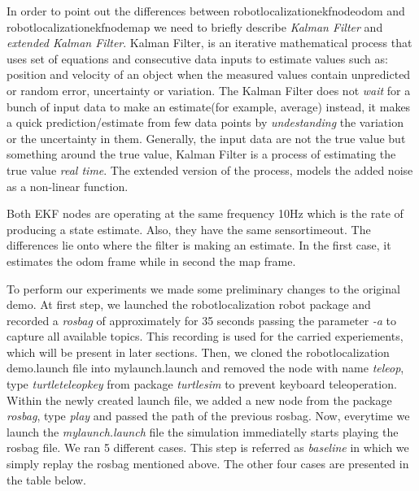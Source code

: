 \documentclass[10pt,a4paper,twocolumn]{article}
\begin{document}
In order to point out the differences between robot\textunderscore localization\textunderscore ekf\textunderscore node\textunderscore odom and robot\textunderscore localization\textunderscore ekf\textunderscore node\textunderscore map we need to briefly describe \textit{Kalman Filter} and \textit{extended Kalman Filter}. Kalman Filter, is an iterative mathematical process that uses set of equations and consecutive data inputs to estimate values such as: position and velocity of an object when the measured values contain unpredicted or random error, uncertainty or variation. The Kalman Filter does not \textit{wait} for a bunch of input data to make an estimate(for example, average) instead, it makes a quick prediction/estimate from few data points by \textit{undestanding} the variation or the uncertainty in them. Generally, the input data are not the true value but something around the true value, Kalman Filter is a process of estimating the true value \textit{real time}. The extended version of the process, models the added noise as a non-linear function.

Both EKF nodes are operating at the same frequency 10Hz which is the rate of producing a state estimate. Also, they have the same sensor\textunderscore timeout. The differences lie onto where the filter is making an estimate. In the first case, it estimates the odom frame while in second the map frame.

To perform our experiments we made some preliminary changes to the original demo. At first step, we launched the robot\textunderscore localization \textunderscore robot package and recorded a \textit{rosbag} of approximately for 35 seconds passing the parameter \textit{-a} to capture all available topics. This recording is used for the carried experiements, which will be present in later sections. Then, we cloned the robot\textunderscore localization \textunderscore demo.launch file into {mylaunch.launch} and removed the node with name \textit{teleop}, type \textit{turtle\textunderscore teleop\textunderscore key} from package \textit{turtlesim} to prevent keyboard teleoperation. Within the newly created launch file, we added a new node from the package \textit{rosbag}, type \textit{play} and passed the path of the previous rosbag. Now, everytime we launch the \textit{mylaunch.launch} file the simulation immediatelly starts playing the rosbag file. We ran 5 different cases. This step is referred as \textit{baseline} in which we simply replay the rosbag mentioned above. The other four cases are presented in the table below.
\end{document}

